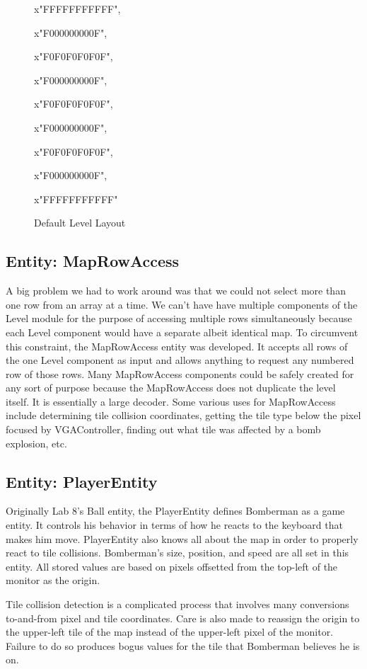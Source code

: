 \documentclass[10pt,a4paper]{article}
\begin{document}
\begin{figure}[H]
\centering
{\ttfamily
x"FFFFFFFFFFF",

x"F000000000F",

x"F0F0F0F0F0F",

x"F000000000F",

x"F0F0F0F0F0F",

x"F000000000F",

x"F0F0F0F0F0F",

x"F000000000F",

x"FFFFFFFFFFF"
}
\caption{Default Level Layout}
\label{fig:map}
\end{figure}

\subsection{Entity: MapRowAccess}
A big problem we had to work around was that we could not select more than one row from an array at a time. We can't have have multiple components of the Level module for the purpose of accessing multiple rows simultaneously because each Level component would have a separate albeit identical map. To circumvent this constraint, the MapRowAccess entity was developed. It accepts all rows of the one Level component as input and allows anything to request any numbered row of those rows. Many MapRowAccess components could be safely created for any sort of purpose because the MapRowAccess does not duplicate the level itself. It is essentially a large decoder. Some various uses for MapRowAccess include determining tile collision coordinates, getting the tile type below the pixel focused by VGAController, finding out what tile was affected by a bomb explosion, etc.

\subsection{Entity: PlayerEntity}
Originally Lab 8's Ball entity, the PlayerEntity defines Bomberman as a game entity. It controls his behavior in terms of how he reacts to the keyboard that makes him move. PlayerEntity also knows all about the map in order to properly react to tile collisions. Bomberman's size, position, and speed are all set in this entity. All stored values are based on pixels offsetted from the top-left of the monitor as the origin.

Tile collision detection is a complicated process that involves many conversions to-and-from pixel and tile coordinates. Care is also made to reassign the origin to the upper-left tile of the map instead of the upper-left pixel of the monitor. Failure to do so produces bogus values for the tile that Bomberman believes he is on.
\end{document}
